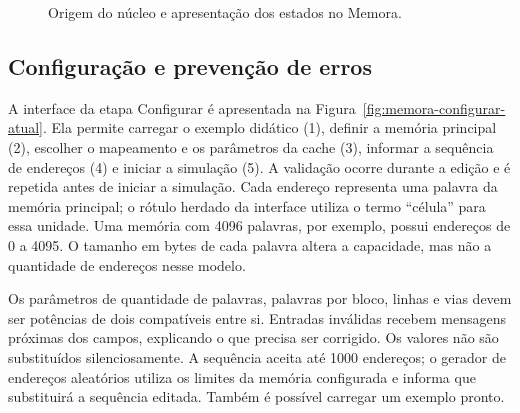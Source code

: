 \begin{figure}[htbp]
\centering
{}
\caption{Origem do núcleo e apresentação dos estados no Memora.}
\label{fig:beto-memora}
\end{figure}

\subsection{Configuração e prevenção de erros}

A interface da etapa Configurar é apresentada na Figura~\ref{fig:memora-configurar-atual}. Ela permite carregar o exemplo didático (1), definir a memória principal (2), escolher o mapeamento e os parâmetros da cache (3), informar a sequência de endereços (4) e iniciar a simulação (5). A validação ocorre durante a edição e é repetida antes de iniciar a simulação. Cada endereço representa uma palavra da memória principal; o rótulo herdado da interface utiliza o termo ``célula'' para essa unidade. Uma memória com 4096 palavras, por exemplo, possui endereços de 0 a 4095. O tamanho em bytes de cada palavra altera a capacidade, mas não a quantidade de endereços nesse modelo.

Os parâmetros de quantidade de palavras, palavras por bloco, linhas e vias devem ser potências de dois compatíveis entre si. Entradas inválidas recebem mensagens próximas dos campos, explicando o que precisa ser corrigido. Os valores não são substituídos silenciosamente. A sequência aceita até 1000 endereços; o gerador de endereços aleatórios utiliza os limites da memória configurada e informa que substituirá a sequência editada. Também é possível carregar um exemplo pronto.

